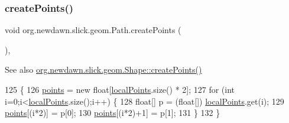 \subsubsection{\texorpdfstring{create\+Points()}{createPoints()}}
{\footnotesize\ttfamily void org.\+newdawn.\+slick.\+geom.\+Path.\+create\+Points (\begin{DoxyParamCaption}{ }\end{DoxyParamCaption})\hspace{0.3cm}{\ttfamily [inline]}, {\ttfamily [protected]}}

\begin{DoxySeeAlso}{See also}
\mbox{\hyperlink{classorg_1_1newdawn_1_1slick_1_1geom_1_1_shape_a2f5907ca87e87f8794161f46389ff8c8}{org.\+newdawn.\+slick.\+geom.\+Shape\+::create\+Points()}} 
\end{DoxySeeAlso}

\begin{DoxyCode}
125                                   \{
126         \mbox{\hyperlink{classorg_1_1newdawn_1_1slick_1_1geom_1_1_shape_a8b4d4058734bbb3b96072e470b92aa37}{points}} = \textcolor{keyword}{new} \textcolor{keywordtype}{float}[\mbox{\hyperlink{classorg_1_1newdawn_1_1slick_1_1geom_1_1_path_af67630a074a387ccbe4ea8ad67e013d8}{localPoints}}.size() * 2];
127         \textcolor{keywordflow}{for} (\textcolor{keywordtype}{int} i=0;i<\mbox{\hyperlink{classorg_1_1newdawn_1_1slick_1_1geom_1_1_path_af67630a074a387ccbe4ea8ad67e013d8}{localPoints}}.size();i++) \{
128             \textcolor{keywordtype}{float}[] p = (\textcolor{keywordtype}{float}[]) \mbox{\hyperlink{classorg_1_1newdawn_1_1slick_1_1geom_1_1_path_af67630a074a387ccbe4ea8ad67e013d8}{localPoints}}.get(i);
129             \mbox{\hyperlink{classorg_1_1newdawn_1_1slick_1_1geom_1_1_shape_a8b4d4058734bbb3b96072e470b92aa37}{points}}[(i*2)] = p[0];
130             \mbox{\hyperlink{classorg_1_1newdawn_1_1slick_1_1geom_1_1_shape_a8b4d4058734bbb3b96072e470b92aa37}{points}}[(i*2)+1] = p[1];
131         \}
132     \}
\end{DoxyCode}
\mbox{\label{classorg_1_1newdawn_1_1slick_1_1geom_1_1_path_aa7ba55ecbfb56e6cfd2158086d362051}} 
